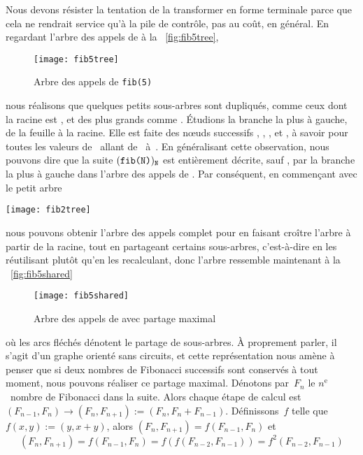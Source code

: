 Nous devons résister la tentation de la transformer en forme terminale
parce que cela ne rendrait service qu'à la pile de contrôle, pas au
coût, en général. En regardant l'arbre des appels de 
à la \fig~\vref{fig:fib5tree},
\begin{figure}[b]
\centering
\texttt{[image: fib5tree]}
\caption{Arbre des appels de \texttt{fib(5)}}
\label{fig:fib5tree}
\end{figure}
nous réalisons que quelques petits sous-arbres sont dupliqués, comme
ceux dont la racine est , et des plus grands comme
. Étudions la branche la plus à gauche, de la feuille
à la racine. Elle est faite des nœuds successifs ,
, ,  et
, à savoir  pour toutes les valeurs
de~ allant de~ à~. En généralisant
cette observation, nous pouvons dire que la suite
\((\texttt{fib(N)})_{\texttt{N}}\) est entièrement décrite, sauf
, par la branche la plus à gauche dans l'arbre des
appels de . Par conséquent, en commençant avec le
petit arbre
\begin{center}
\texttt{[image: fib2tree]}
\end{center}
nous pouvons obtenir l'arbre des appels complet pour 
en faisant croître l'arbre à partir de la racine, tout en partageant
certains sous-arbres, c'est-à-dire en les réutilisant plutôt qu'en les
recalculant, donc l'arbre ressemble maintenant à la
\fig~\vref{fig:fib5shared}
\begin{figure}
\centering
\texttt{[image: fib5shared]}
\caption{Arbre des appels de  avec partage maximal}
\label{fig:fib5shared}
\end{figure}
où les arcs fléchés dénotent le partage de sous-arbres. À proprement
parler, il s'agit d'un graphe orienté sans circuits, et cette
représentation nous amène à penser que si deux nombres de Fibonacci
successifs sont conservés à tout moment, nous pouvons réaliser ce
partage maximal. Dénotons par~\(F_n\) le \(n^\text{e}\)~nombre de
Fibonacci dans la suite. Alors chaque étape de calcul est
\((F_{n-1},F_{n}) \rightarrow (F_{n}, F_{n+1}) :=
(F_{n},F_{n}+F_{n-1})\). Définissons~\(f\) telle que \(f(x,y) :=
(y,x+y)\), alors \((F_{n},F_{n+1}) = f(F_{n-1},F_{n})\) et
\begin{equation*}
(F_n,F_{n+1}) = f(F_{n-1},F_{n}) = f(f(F_{n-2},F_{n-1})) =
f^2(F_{n-2},F_{n-1})
\end{equation*}
